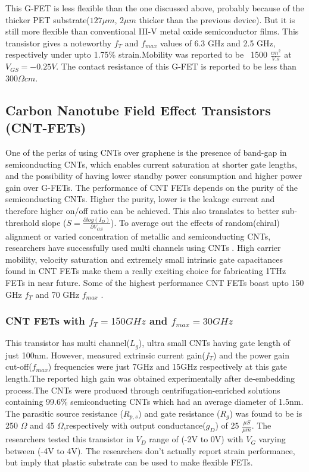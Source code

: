 \documentclass[a4paper,11pt]{article}
\begin{document}
This G-FET is less flexible than the one discussed above, probably because of the thicker PET substrate($127\mu m$, $2\mu m$ thicker than the previous device). But it is still more flexible than conventional III-V metal oxide semiconductor films\cite{wang2012self}. This transistor gives a noteworthy $f_T$  and $f_{max}$ values of 6.3 GHz and 2.5 GHz, respectively under upto 1.75\% strain.Mobility was reported to be ~1500 $\frac{cm^2}{V.s}$ at $V_{GS}=-0.25V$. The contact resistance of this G-FET is reported to be less than 300$\Omega cm$.  

\subsection{Carbon Nanotube Field Effect Transistors (CNT-FETs)}
One of the perks of using CNTs over graphene is the presence of band-gap in semiconducting CNTs, which enables current saturation at shorter gate lengths, and the possibility of having lower standby power consumption and higher power gain over G-FETs. The performance of CNT FETs depends on the purity of the semiconducting CNTs. Higher the purity, lower is the leakage current and therefore higher on/off ratio can be achieved\cite{zhong2017carbon}. This also translates to better sub-threshold slope ($S = \frac{\partial log(I_D)}{\partial V_{GS}}$). To average out the effects of random(chiral) alignment or varied concentration of metallic and semiconducting CNTs, researchers have successfully used multi channels using CNTs\cite{bethoux20068} \cite{steiner2012high}. High carrier mobility, velocity saturation and extremely small intrinsic gate capacitances found in CNT FETs make them a really exciting choice for fabricating 1THz FETs in near future. Some of the highest performance CNT FETs boast upto 150 GHz $f_T$\cite{steiner2012high} and 70 GHz $f_{max}$ \cite{cao2016radio}.

\subsubsection{CNT FETs with $f_T =150 GHz$   and $f_{max} = 30 GHz$ \cite{steiner2012high} }
This transistor has multi channel($L_g$), ultra small CNTs having gate length of just 100nm. However, measured extrinsic current gain($f_T$) and the power gain cut-off($f_{max}$) frequencies were just 7GHz and 15GHz respectively at this gate length.The reported high gain was obtained experimentally after de-embedding process.The CNTs were produced through centrifugation-enriched solutions containing 99.6\% semiconducting CNTs which had an average diameter of 1.5nm. The parasitic source resistance ($R_{p,s}$) and gate resistance ($R_{g}$)  was found to be is 250 $\Omega$ and 45 $\Omega$,respectively with output conductance($g_D$) of 25 $\frac{\mu S}{\mu m}$.  The researchers tested this transistor in $V_{D}$ range of (-2V to 0V) with $V_{G}$ varying between (-4V to 4V). The researchers don't actually report strain performance, but imply that plastic substrate can be used to make flexible FETs.    
\end{document}
